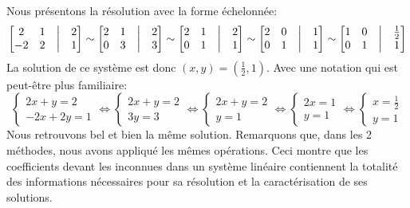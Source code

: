 


\begin{exercice}
Nous présentons la résolution avec la forme échelonnée:
$$    
\begin{bmatrix}
    2 & 1 & \bigm| & 2\\
    -2 & 2 & \bigm| & 1
\end{bmatrix} \sim
\begin{bmatrix}
    2 & 1 & \bigm| & 2\\
    0 & 3 & \bigm| & 3
\end{bmatrix} \sim
\begin{bmatrix}
    2 & 1 & \bigm| & 2\\
    0 & 1 & \bigm| & 1
\end{bmatrix} \sim
\begin{bmatrix}
    2 & 0 & \bigm| & 1\\
    0 & 1 & \bigm| & 1
\end{bmatrix} \sim
\begin{bmatrix}
    1 & 0 & \bigm| & \frac{1}2\\
    0 & 1 & \bigm| & 1
\end{bmatrix}
$$
La solution de ce système est donc $(x,y) = (\frac{1}{2},1)$. Avec une notation qui est peut-être plus familiaire:
$$
\begin{cases}
    2x + y = 2 \\
    -2x + 2y = 1
\end{cases} \iff
\begin{cases}
    2x + y = 2 \\
    3y = 3
\end{cases} \iff
\begin{cases}
    2x + y = 2 \\
    y = 1
\end{cases} \iff
\begin{cases}
    2x = 1 \\
    y = 1
\end{cases} \iff
\begin{cases}
    x = \frac{1}{2} \\
    y = 1
\end{cases}
$$
Nous retrouvons bel et bien la même solution. Remarquons que, dans les 2 méthodes, nous avons appliqué les mêmes opérations. Ceci montre que les coefficients devant les inconnues dans un système linéaire contiennent la totalité des informations nécessaires pour sa résolution et la caractérisation de ses solutions. \\
\end{exercice}

